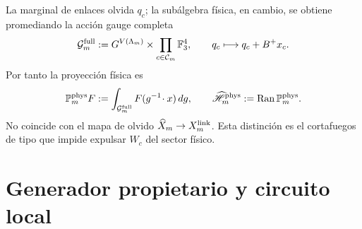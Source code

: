 La marginal de enlaces olvida $q_c$; la subálgebra física, en cambio, se obtiene
promediando la acción gauge completa
\begin{equation}\label{eq:pdf2-ym-full-gauge-group}
 \mathcal G_m^{\rm full}
 :=G^{V(\Lambda_m)}\times
 \prod_{c\in\mathcal C_m}\mathbb F_3^4,
 \qquad q_c\longmapsto q_c+B^+x_c.
\end{equation}
Por tanto la proyección física es
\begin{equation}\label{eq:pdf2-ym-full-physical-projection}
 \mathbb P_m^{\rm phys}F
 :=\int_{\mathcal G_m^{\rm full}}F(g^{-1}\!\cdot x)\,dg,
 \qquad
 \widehat{\mathscr H}_m^{\rm phys}
 :=\operatorname{Ran}\mathbb P_m^{\rm phys}.
\end{equation}
No coincide con el mapa de olvido
$\widehat X_m\to X_m^{\rm link}$. Esta distinción es el cortafuegos de tipo
que impide expulsar $W_c$ del sector físico.

\section{Generador propietario y circuito local}

